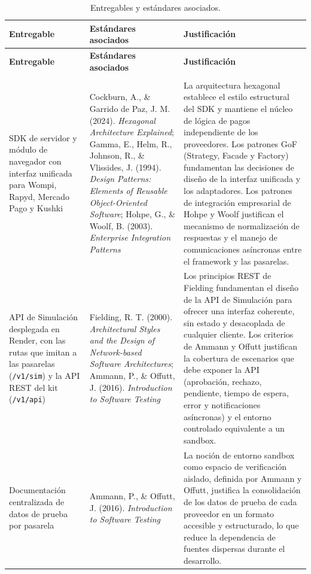 \begin{center}
\renewcommand{\arraystretch}{1.2}
\begin{longtable}{|P{0.227}|P{0.229}|P{0.519}|}
  \hline
  \textbf{Entregable} & \textbf{Estándares asociados} & \textbf{Justificación} \\
  \hline
  \endfirsthead
  \hline
  \textbf{Entregable} & \textbf{Estándares asociados} & \textbf{Justificación} \\
  \hline
  \endhead
  \caption{Entregables y estándares asociados.}
  \label{tab:entregables}\\
  \endlastfoot
  SDK de servidor y módulo de navegador con interfaz unificada para Wompi, Rapyd, Mercado Pago y Kushki & Cockburn, A., \& Garrido de Paz, J. M. (2024). \textit{Hexagonal Architecture Explained}; Gamma, E., Helm, R., Johnson, R., \& Vlissides, J. (1994). \textit{Design Patterns: Elements of Reusable Object-Oriented Software}; Hohpe, G., \& Woolf, B. (2003). \textit{Enterprise Integration Patterns} & La arquitectura hexagonal establece el estilo estructural del SDK y mantiene el núcleo de lógica de pagos independiente de los proveedores. Los patrones GoF (Strategy, Facade y Factory) fundamentan las decisiones de diseño de la interfaz unificada y los adaptadores. Los patrones de integración empresarial de Hohpe y Woolf justifican el mecanismo de normalización de respuestas y el manejo de comunicaciones asíncronas entre el framework y las pasarelas. \\
  \hline
  API de Simulación desplegada en Render, con las rutas que imitan a las pasarelas (\texttt{/v1/sim}) y la API REST del kit (\texttt{/v1/api}) & Fielding, R. T. (2000). \textit{Architectural Styles and the Design of Network-based Software Architectures}; Ammann, P., \& Offutt, J. (2016). \textit{Introduction to Software Testing} & Los principios REST de Fielding fundamentan el diseño de la API de Simulación para ofrecer una interfaz coherente, sin estado y desacoplada de cualquier cliente. Los criterios de Ammann y Offutt justifican la cobertura de escenarios que debe exponer la API (aprobación, rechazo, pendiente, tiempo de espera, error y notificaciones asíncronas) y el entorno controlado equivalente a un sandbox. \\
  \hline
  Documentación centralizada de datos de prueba por pasarela & Ammann, P., \& Offutt, J. (2016). \textit{Introduction to Software Testing} & La noción de entorno sandbox como espacio de verificación aislado, definida por Ammann y Offutt, justifica la consolidación de los datos de prueba de cada proveedor en un formato accesible y estructurado, lo que reduce la dependencia de fuentes dispersas durante el desarrollo. \\

\end{longtable}
\end{center}
